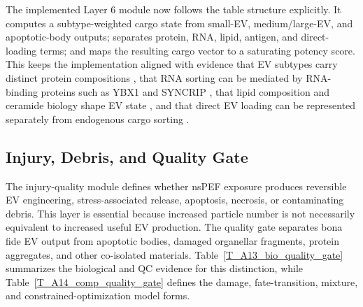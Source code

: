 The implemented Layer 6 module now follows the table structure explicitly. It computes a subtype-weighted cargo state from small-EV, medium/large-EV, and apoptotic-body outputs; separates protein, RNA, lipid, antigen, and direct-loading terms; and maps the resulting cargo vector to a saturating potency score. This keeps the implementation aligned with evidence that EV subtypes carry distinct protein compositions \cite{jeppesen2019reassessment,kugeratski2021quantitative}, that RNA sorting can be mediated by RNA-binding proteins such as YBX1 and SYNCRIP \cite{shurtleff2016ybox,liu2021selective,santangelo2016syncrip}, that lipid composition and ceramide biology shape EV state \cite{skotland2023lipids}, and that direct EV loading can be represented separately from endogenous cargo sorting \cite{fuhrmann2015active,didiot2018optimized}.

\subsection*{Injury, Debris, and Quality Gate}

The injury-quality module defines whether nsPEF exposure produces reversible EV engineering, stress-associated release, apoptosis, necrosis, or contaminating debris. This layer is essential because increased particle number is not necessarily equivalent to increased useful EV production. The quality gate separates bona fide EV output from apoptotic bodies, damaged organellar fragments, protein aggregates, and other co-isolated materials. Table~\ref{T_A13_bio_quality_gate} summarizes the biological and QC evidence for this distinction, while Table~\ref{T_A14_comp_quality_gate} defines the damage, fate-transition, mixture, and constrained-optimization model forms.

